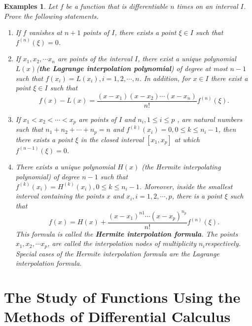\documentclass[a4paper,12pt]{article} %
\newtheorem{example}{Examples}
\begin{document}
\begin{example}
    \normalfont
    Let $f$ be a function that is differentiable $n$ times on an interval 
    $I$. Prove the following statements.
    \begin{enumerate}
        \item If $f$ vanishes at $n+1$ points of $I$, there exists a point 
            $\xi \in I$ such that $f^{(n)}(\xi) = 0$.
        \item If $x_1, x_2, \cdots x_n$ are points of the interval $I$, there exist 
            a unique polynomial $L(x)$(\textbf{the Lagrange interpolation polynomial})
            of degree at most $n-1$ such that $f(x_i) = L(x_i), i=1,2,\cdots,n$.
            In addition, for $x \in I$ there exist a point $\xi \in I$ such that 
            \[
                f(x) - L(x) = \frac{(x - x_1)(x - x_2)\cdots(x - x_n)}{n!}f^{(n)}(\xi).
                \]
        \item If $x_1 < x_2 < \cdots < x_p$ are points of $I$ and $n_i, 1\le i \le p$ , are 
            natural numbers such that $n_1 + n_2 + \cdots + n_p = n$ and 
            $f^{(k)}(x_i) = 0, 0 \le k \le n_i-1$, then there exists a point $\xi$ in the 
            closed interval $[x_1, x_p]$ at which $f^{(n-1)}(\xi) = 0$.
        \item There exists a unique polynomial $H(x)$ (the Hermite interpolating 
            polynomial) of degree $n-1$ such that $f^{(k)}(x_i) = H^{(k)}(x_i), 0 \le k \le n_i-1$.
            Moreover, inside the smallest interval containing the points $x$ and 
            $x_i, i=1,2,\cdots,p$, there is a point $\xi$ such that 
            \[
                f(x) = H(x) + \frac{(x-x_1)^{n1} \cdots (x - x_p)^{n_p}}{n!}f^{(n)}(\xi).
                \]
            This formula is called the \textbf{Hermite interpolation formula}.
            The points $x_1, x_2, \cdots x_p$, are called the interpolation nodes of 
            multiplicity $n_i$respectively. Special cases of the Hermite interpolation 
            formula are the Lagrange interpolation formula.
    \end{enumerate}
\end{example}

\section{The Study of Functions Using the Methods of Differential Calculus}
\end{document}
